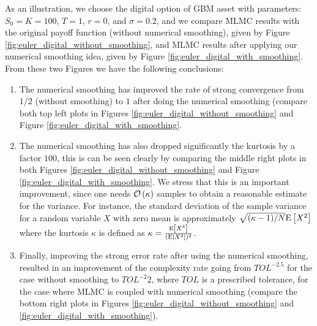 As an illustration, we choose the digital option of GBM asset with parameters: $S_0=K=100$, $T=1$, $r= 0$, and   $\sigma=0.2$, and we compare MLMC results with the original payoff function (without numerical smoothing), given by Figure \ref{fig:euler_digital_without_smoothing},  and MLMC results after applying our numerical smoothing idea, given by Figure \ref{fig:euler_digital_with_smoothing}. From these two Figures we have the following conclusions:
\begin{enumerate}
\item The numerical smoothing has improved the rate of strong convergence from $1/2$ (without smoothing) to $1$ after doing the numerical smoothing (compare both top left plots in Figures \ref{fig:euler_digital_without_smoothing} and Figure \ref{fig:euler_digital_with_smoothing}.
\item The numerical smoothing has also dropped significantly the kurtosis by a factor $100$, this is can be seen clearly by comparing the middle right plots in both Figures \ref{fig:euler_digital_without_smoothing} and Figure \ref{fig:euler_digital_with_smoothing}. We stress that this is an important improvement, since one needs ${\mathcal{O}}\left(\kappa\right)$ samples  to obtain a reasonable estimate for the variance. For instance,  the standard deviation of the sample variance for a random variable $X$ with zero mean is approximately $\sqrt{(\kappa-1)/N} \mathrm{E}\left[X^2\right]$ where the kurtosis $\kappa$ is defined as $\kappa = \frac{\mathrm{E}\left[X^4\right]}{(\mathrm{E}\left[X^2\right])^2}$.  
\item Finally, improving the strong error rate after using the numerical smoothing, resulted in an improvement of the complexity rate going from $TOL^{-2.5}$ for the case without smoothing to  $TOL^{-2}2$, where $TOL$ is a prescribed tolerance, for the case where MLMC is coupled with numerical smoothing (compare the bottom right plots in Figures \ref{fig:euler_digital_without_smoothing} and \ref{fig:euler_digital_with_smoothing}).
\end{enumerate}

